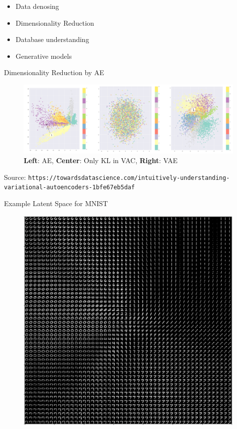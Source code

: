 \documentclass[xcolor=pdftex,dvipsnames,table,mathserif]{beamer}
\begin{document}

\begin{frame}
\begin{itemize}
\item Data denosing
\item Dimensionality Reduction
\item Database understanding
\item Generative models
\end{itemize}
\end{frame}


\begin{frame}{Dimensionality Reduction by AE}
\begin{figure}
\includegraphics[width=.75\columnwidth]{../graphics/VAEMNIST}
\caption{\textbf{Left}: AE, \textbf{Center}: Only KL in VAC, \textbf{Right}: VAE}
\end{figure}
Source: \texttt{https://towardsdatascience.com/intuitively-understanding-variational-autoencoders-1bfe67eb5daf}
\end{frame}

\begin{frame}{Example Latent Space for MNIST}
\begin{figure}
\includegraphics[width=.75\columnwidth]{../graphics/LatentMNIST}
\end{figure}
\end{frame}
\end{document}
